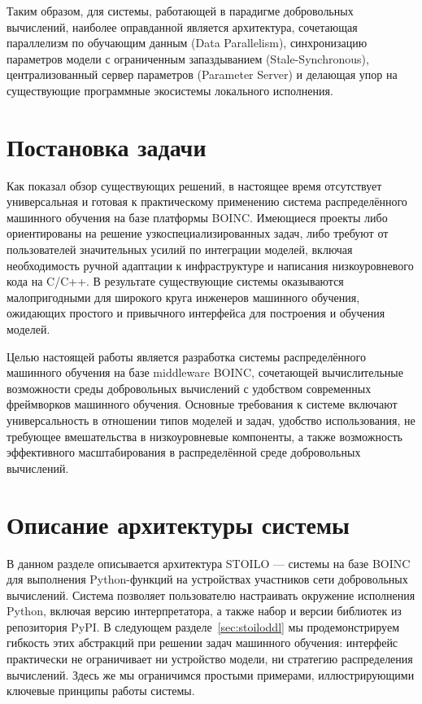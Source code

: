 \documentclass[a4paper,12pt]{extarticle}
\begin{document}
Таким образом, для системы, работающей в парадигме добровольных вычислений, наиболее оправданной является архитектура, сочетающая параллелизм по обучающим данным (Data Parallelism), синхронизацию параметров модели с ограниченным запаздыванием (Stale-Synchronous), централизованный сервер параметров (Parameter Server) и делающая упор на существующие программные экосистемы локального исполнения.

\section{Постановка задачи}

Как показал обзор существующих решений, в настоящее время отсутствует универсальная и готовая к практическому применению система распределённого машинного обучения на базе платформы BOINC.
Имеющиеся проекты либо ориентированы на решение узкоспециализированных задач, либо требуют от пользователей значительных усилий по интеграции моделей, включая необходимость ручной адаптации к инфраструктуре и написания низкоуровневого кода на C/C++.
В результате существующие системы оказываются малопригодными для широкого круга инженеров машинного обучения, ожидающих простого и привычного интерфейса для построения и обучения моделей.

Целью настоящей работы является разработка системы распределённого машинного обучения на базе middleware BOINC, сочетающей вычислительные возможности среды добровольных вычислений с удобством современных фреймворков машинного обучения.
Основные требования к системе включают универсальность в отношении типов моделей и задач, удобство использования, не требующее вмешательства в низкоуровневые компоненты, а также возможность эффективного масштабирования в распределённой среде добровольных вычислений.

\section{Описание архитектуры системы}

В данном разделе описывается архитектура STOILO — системы на базе BOINC для выполнения Python-функций на устройствах участников сети добровольных вычислений.
Система позволяет пользователю настраивать окружение исполнения Python, включая версию интерпретатора, а также набор и версии библиотек из репозитория PyPI.
В следующем разделе~\ref{sec:stoiloddl} мы продемонстрируем гибкость этих абстракций при решении задач машинного обучения: интерфейс практически не ограничивает ни устройство модели, ни стратегию распределения вычислений.
Здесь же мы ограничимся простыми примерами, иллюстрирующими ключевые принципы работы системы.
\end{document}
